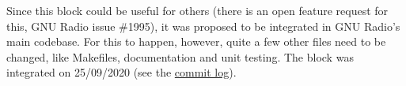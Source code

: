 Since this block could be useful for others (there is an open feature request for this, GNU Radio issue \#1995), it was proposed to be integrated in GNU Radio's main codebase. For this to happen, however, quite a few other files need to be changed, like Makefiles, documentation and unit testing. The block was integrated on 25/09/2020 (see the \href{https://github.com/gnuradio/gnuradio/commit/c196dacea56ef938902646a2143907858415b240}{commit log}).
